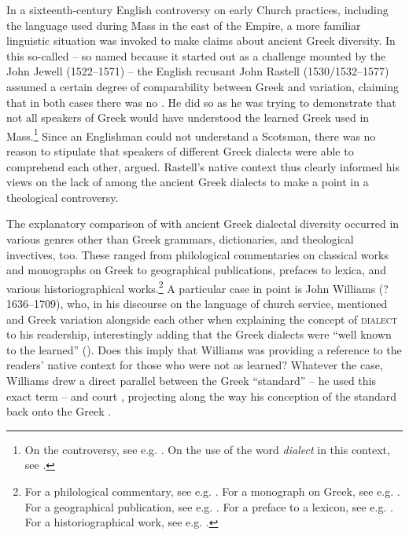 In a sixteenth-century English controversy on early Church practices, including the language used during Mass in the east of the  Empire, a more familiar linguistic situation was invoked to make claims about ancient Greek diversity. In this so-called  – so named because it started out as a challenge mounted by the  John Jewell (1522–1571) – the English recusant John Rastell (1530/1532–1577) assumed a certain degree of comparability between Greek and  variation, claiming that in both cases there was no . He did so as he was trying to demonstrate that not all speakers of Greek would have understood the learned Greek used in Mass.\footnote{On the controversy, see e.g. \citet[115--154]{Jenkins2006}. On the use of the  word \textit{dialect} in this context, see \citet[647--651]{VanRooyConsidine2016}.} Since an Englishman could not understand a Scotsman, there was no reason to stipulate that speakers of different Greek dialects were able to comprehend each other, \citet[68\textsc{\textsuperscript{r}}]{Rastell1566} argued. Rastell’s native  context thus clearly informed his views on the lack of  among the ancient Greek dialects to make a point in a theological controversy.

The explanatory comparison of  with ancient Greek dialectal diversity occurred in various genres other than Greek grammars, dictionaries, and theological invectives, too. These ranged from philological commentaries on classical works and monographs on  Greek to geographical publications, prefaces to lexica, and various historiographical works.\footnote{For a philological commentary, see e.g. \citet[68; –Greek comparison]{Casaubon1587}. For a monograph on  Greek, see e.g. \citet[212--213; also –Greek]{Cottiere1646}. For a geographical publication, see e.g. \citet[60; –Greek comparison]{Speed1676}. For a preface to a lexicon, see e.g. \citet[(b.3)\textsuperscript{v}\textsc{;} also –Greek]{Phillips1658}. For a historiographical work, see e.g. \citet[108, 117; /–Greek comparison]{Freret1809}.} A particular case in point is John Williams (?1636–1709), who, in his discourse on the language of church service, mentioned  and Greek variation alongside each other when explaining the concept of \textsc{dialect} to his readership, interestingly adding that the Greek dialects were “well known to the learned” (\citeyear[5]{Williams1685}). Does this imply that Williams was providing a reference to the readers’ native context for those who were not as learned? Whatever the case, Williams drew a direct parallel between the Greek  “standard” – he used this exact term – and court , projecting along the way his conception of the  standard back onto the Greek .

